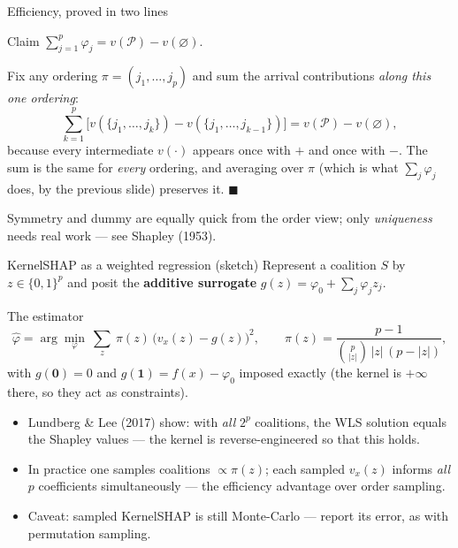 \documentclass[aspectratio=169,11pt]{beamer}
\begin{document}
\begin{frame}{Efficiency, proved in two lines}
  \footnotesize
  \begin{block}{Claim}
    $\sum_{j=1}^{p}\varphi_j = v(\mathcal{P}) - v(\varnothing)$.
  \end{block}
  \begin{readme}[Telescoping]
    Fix any ordering $\pi = (j_1,\dots,j_p)$ and sum the arrival contributions
    \emph{along this one ordering}:
    \[
      \sum_{k=1}^{p}\bigl[v(\{j_1,\dots,j_k\}) - v(\{j_1,\dots,j_{k-1}\})\bigr]
      = v(\mathcal{P}) - v(\varnothing),
    \]
    because every intermediate $v(\cdot)$ appears once with $+$ and once with $-$.
    The sum is the same for \emph{every} ordering, and averaging over $\pi$ (which is
    what $\sum_j\varphi_j$ does, by the previous slide) preserves it. $\blacksquare$
  \end{readme}
  \begin{takeaway}
    Symmetry and dummy are equally quick from the order view; only
    \emph{uniqueness} needs real work --- see Shapley (1953).
  \end{takeaway}
\end{frame}

\begin{frame}{KernelSHAP as a weighted regression (sketch)}
  Represent a coalition $S$ by $z\in\{0,1\}^p$ and posit the \textbf{additive
  surrogate} $g(z)=\varphi_0+\sum_j \varphi_j z_j$.
  \begin{block}{The estimator}
    \[
      \hat\varphi = \arg\min_{\varphi}\ \sum_{z}\ \pi(z)\,
      \bigl(v_x(z) - g(z)\bigr)^2,
      \qquad
      \pi(z)=\frac{p-1}{\binom{p}{|z|}\,|z|\,(p-|z|)},
    \]
    with $g(\mathbf{0})=0$ and $g(\mathbf{1})=f(x)-\varphi_0$ imposed exactly
    (the kernel is $+\infty$ there, so they act as constraints).
  \end{block}
  \begin{readme}
    \begin{itemize}
      \item Lundberg \& Lee (2017) show: with \emph{all} $2^p$ coalitions, the WLS
            solution equals the Shapley values --- the kernel is reverse-engineered
            so that this holds.
      \item In practice one samples coalitions $\propto\pi(z)$; each sampled $v_x(z)$
            informs \emph{all} $p$ coefficients simultaneously --- the efficiency
            advantage over order sampling.
      \item Caveat: sampled KernelSHAP is still Monte-Carlo --- report its error, as
            with permutation sampling.
    \end{itemize}
  \end{readme}
\end{frame}
\end{document}
